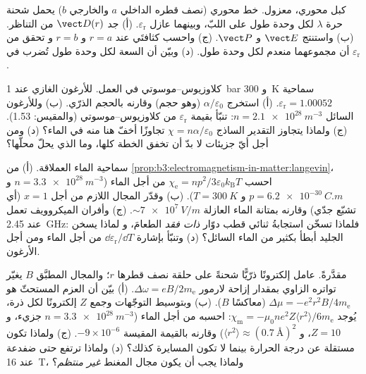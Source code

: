 \begin{exercise}[$\star\star$]\label{exo:b3:electromagnetism-in-matter:5}
كبل محوري، معزول. خط محوري (نصف قطره الداخلي $a$ والخارجي
$b$) يحمل شحنة حرة $\lambda$ لكل وحدة طول على اللبّ،
وبينهما عازل $\varepsilon_{\text{r}}$. (أ) جد
$\vect D(r)$ من التناظر. (ب) واستنتج $\vect E$ و $\vect P$.
(ج) واحسب كثافتَي  عند $r = a$ و $r = b$ و
تحقق من أن مجموعهما منعدم لكل وحدة طول. (د) وبيّن أن السعة
لكل وحدة طول تُضرب في $\varepsilon_{\text{r}}$.
\end{exercise}

\begin{exercise}[$\star\star$]\label{exo:b3:electromagnetism-in-matter:6}
كلاوزيوس--موسوتي في العمل. للأرغون الغازي عند \qty{1}{bar} و
\qty{300}{K} سماحية $\varepsilon_{\text{r}} = 1.00052$. (أ) استخرج
$\alpha/\varepsilon_0$ (وهو حجم) وقارنه بالحجم
الذرّي. (ب) وللأرغون السائل $n = \qty{2.1e28}{m^{-3}}$: تنبّأ بقيمة
$\varepsilon_{\text{r}}$ من كلاوزيوس--موسوتي (والمقيس: 1.53).
(ج) ولماذا يتجاوز التقدير الساذج $\chi = n\alpha/\varepsilon_0$
تجاوزًا أخفّ هنا منه في الماء؟ (د) ومن أجل أيّ جزيئات لا بدّ أن
تخفق الخطة كلها، وما الذي يحلّ محلّها؟
\end{exercise}

\begin{exercise}[$\star\star$]\label{exo:b3:electromagnetism-in-matter:7}
سماحية الماء العملاقة. (أ) من
\cref{prop:b3:electromagnetism-in-matter:langevin}، احسب
$\chi_{\text{e}} = np^2/3\varepsilon_0k_{\text{B}}T$ من أجل الماء
($n = \qty{3.3e28}{m^{-3}}$ و $p = \qty{6.2e-30}{C.m}$ و
$T = \qty{300}{K}$). (ب) وقدّر المجال اللازم من أجل $x = 1$
(أي تشبّع جدّي) وقارنه بمتانة الماء العازلة
$\sim\qty{7e7}{V/m}$. (ج) وأفران الميكروويف تعمل عند \qty{2.45}{GHz}:
فلماذا تسخّن استجابةُ ثنائي قطب دوّار \emph{ذات فقد} الطعامَ، و
لماذا يسخن الجليد أبطأ بكثير من الماء السائل؟ (د) وتنبّأ
بإشارة $\dd\varepsilon_{\text{r}}/\dd T$ من أجل الماء ومن أجل
الأرغون.
\end{exercise}

\begin{exercise}[$\star\star$]\label{exo:b3:electromagnetism-in-matter:8}
 مقدَّرةً. عامل إلكترونًا ذرّيًّا شحنةً على
حلقة نصف قطرها $r$؛ والمجال المطبَّق $B$ يغيّر تواتره الزاوي بمقدار
إزاحة لارمور $\Delta\omega = eB/2m_{\text{e}}$. (أ) بيّن أن
العزم المستحثّ هو $\Delta\mu = -e^2r^2B/4m_{\text{e}}$ (معاكسًا
$B$). (ب) وبتوسيط التوجّهات وجمع $Z$ إلكترونًا لكل
ذرة، يُوجد $\chi_{\text{m}} = -\mu_0ne^2Z\langle
r^2\rangle/6m_{\text{e}}$: احسبه من أجل الماء ($n =
\qty{3.3e28}{m^{-3}}$ جزيء، و $Z = 10$، و $\langle r^2\rangle
\approx (\qty{0.7}{\angstrom})^2$) وقارنه بالقيمة المقيسة
$-9\times10^{-6}$. (ج) ولماذا تكون  مستقلة عن درجة الحرارة
بينما لا تكون المسايرة كذلك؟ (د) ولماذا ترتفع حتى ضفدعة عند
\qty{16}{T}، ولماذا يجب أن يكون مجال المغنط \emph{غير منتظم}؟
\end{exercise}

